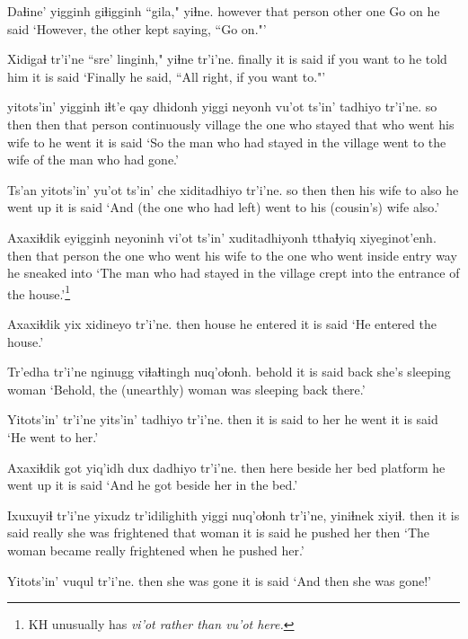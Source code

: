 \documentclass[12pt]{article}
\begin{document}
\gll Daɬine' yigginh giɬigginh ``gila," yiɬne.
however {that person} {other one} {Go on} {he said}
\glt `However, the other kept saying, ``Go on."'
\glend

\gll Xidigaɬ tr'i'ne {``sre' linginh,"} yiɬne  tr'i'ne.
finally  {it is said} {if you want to} {he told him} {it is said}
\glt `Finally he said, ``All right, if you want to."'
\glend

 yitots'in' yigginh iɬt'e qay dhidonh yiggi neyonh vu'ot  ts'in' tadhiyo tr'i'ne.
{so then} then  {that person} continuously village {the one who stayed} that {who went} {his wife} to {he went} {it is said}
\glt `So the man who had stayed in the village went to the wife of the man who had gone.'
\glend

\gll Ts'an yitots'in' yu'ot  ts'in' che xiditadhiyo  tr'i'ne.
{so then} then  {his wife} to also {he went up}  {it is said}
\glt `And (the one who had left) went to his (cousin's) wife also.'
\glend

\gll Axaxiɬdik eyigginh neyoninh vi'ot  ts'in' xuditadhiyonh  tthaɬyiq xiyeginot'enh.
then  {that person} {the one who went} {his wife} to {the one who went inside} {entry way} {he sneaked into}
\glt `The man who had stayed in the village crept into the entrance of the house.'\footnote{KH unusually has \em vi'ot \em rather than \em vu'ot \em here.}
\glend

\gll Axaxiɬdik yix xidineyo tr'i'ne.
then  house {he entered} {it is said}
\glt `He entered the house.'
\glend

\gll Tr'edha tr'i'ne nginugg viɬaɬtingh nuq'oɬonh.
behold  {it is said} back {she's sleeping} woman
\glt `Behold, the (unearthly) woman was sleeping back there.'
\glend

\gll Yitots'in' tr'i'ne yits'in' tadhiyo tr'i'ne.
then  {it is said} {to her} {he went} {it is said}
\glt `He went to her.'
\glend

\gll Axaxiɬdik got yiq'idh dux  dadhiyo tr'i'ne.
then  here {beside her} {bed platform} {he went up} {it is said}
\glt `And he got beside her in the bed.'
\glend

\gll Ixuxuyiɬ tr'i'ne yixudz tr'idilighith  yiggi nuq'oɬonh tr'i'ne, yiniɬnek xiyiɬ.
then  {it is said} really  {she was frightened} that woman {it is said} {he pushed her} then
\glt `The woman became really frightened when he pushed her.'
\glend

\gll Yitots'in' vuqul  tr'i'ne.
then  {she was gone} {it is said}
\glt `And then she was gone!'
\glend
\end{document}
